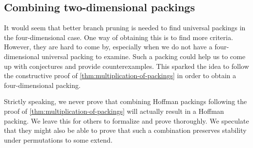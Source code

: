 \subsection{Combining two-dimensional packings}
It would seem that better branch pruning is needed to find universal packings in the four-dimensional case. One way of obtaining this is to find more criteria. However, they are hard to come by, especially when we do not have a four-dimensional universal packing to examine. Such a packing could help us to come up with conjectures and provide counterexamples. This sparked the idea to follow the constructive proof of \cref{thm:multiplication-of-packings} in order to obtain a four-dimensional packing.


\begin{remark}
Strictly speaking, we never prove that combining Hoffman packings following the proof of \cref{thm:multiplication-of-packings} will actually result in a Hoffman packing. We leave this for others to formalize and prove thoroughly. We speculate that they might also be able to prove that such a combination preserves stability under permutations to some extend.
\end{remark}

